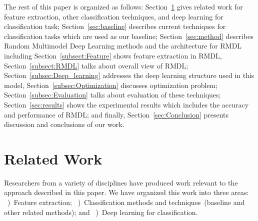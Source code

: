 \documentclass[sigconf, final]{acmart}
\begin{document}
The rest of this paper is organized as follows: Section~\ref{sec:related} gives related work for feature extraction, other classification techniques, and deep learning for classification task;   Section~\ref{sec:baseline} describes current techniques for classification tasks which are used as our baseline; Section~\ref{sec:method} describes Random Multimodel Deep Learning methods and the architecture for RMDL including Section~\ref{subsect:Feature} shows feature extraction in RMDL, Section~\ref{subsect:RMDL} talks about overall view of RMDL; Section~\ref{subsec:Deep_learning} addresses the deep learning structure used in this model, Section~\ref{subsec:Optimization} discusses optimization problem; Section~\ref{subsec:Evaluation} talks about evaluation of these techniques; Section~\ref{sec:results} shows the experimental results which includes the accuracy and performance of RMDL; and finally, Section~\ref{sec:Conclusion} presents discussion and conclusions of our work.

\vspace{-0.1in}
\section{Related Work}\label{sec:related}
Researchers from a variety of disciplines have produced work relevant to the approach described in this paper. We have organized this work into three areas: ~)~Feature extraction; ~)~Classification methods and techniques~(baseline and other related methods); and ~)~Deep learning for classification.
\end{document}
